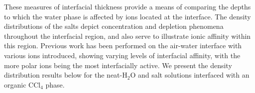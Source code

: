 These measures of interfacial thickness provide a means of comparing the depths to which the water phase is affected by ions located at the interface. The density distributions of the salts depict concentration and depletion phenomena throughout the interfacial region, and also serve to illustrate ionic affinity within this region. Previous work has been performed on the air-water interface with various ions introduced, showing varying levels of interfacial affinity, with the more polar ions being the most interfacially active. We present the density distribution results below for the neat-H$_2$O and salt solutions interfaced with an organic CCl$_4$ phase. %




